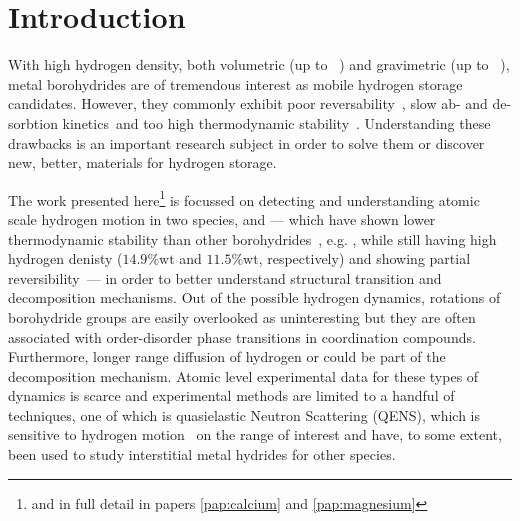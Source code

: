 \section{Introduction}
\label{sec:borohydrides-introduction}


With high hydrogen density, both volumetric (up to \missing{}~\citemiss) and gravimetric (up to \missing{}~\citemiss), metal borohydrides are of tremendous interest as mobile hydrogen storage candidates.
However, they commonly exhibit poor reversability~\citemiss, slow ab- and de-sorbtion kinetics~\citemiss and too high thermodynamic stability~\citemiss.
Understanding these drawbacks is an important research subject in order to solve them or discover new, better, materials for hydrogen storage.

The work presented here\footnote{and in full detail in papers \ref{pap:calcium} and \ref{pap:magnesium}} is focussed on detecting and understanding atomic scale hydrogen motion in two species,  and  --- which have shown lower thermodynamic stability than other borohydrides~\cite{borohydride-stability-2006, calcium-stability-2006}, e.g. , while still having high hydrogen denisty ($14.9\%\text{wt}$ and $11.5\%\text{wt}$, respectively) and showing partial reversibility~\citemiss --- in order to better understand structural transition and decomposition mechanisms.
Out of the possible hydrogen dynamics, rotations of borohydride groups are easily overlooked as uninteresting but they are often associated with order-disorder phase transitions in coordination compounds.~\cite{order-disorder-2006, order-disorder-2010}
Furthermore, longer range diffusion of hydrogen or  could be part of the decomposition mechanism.
Atomic level experimental data for these types of dynamics is scarce and experimental methods are limited to a handful of techniques, one of which is quasielastic Neutron Scattering (QENS), which is sensitive to hydrogen motion~\cite{qens-bee-1988} on the range of interest and have, to some extent, been used to study interstitial metal hydrides for other species.~\citemiss

